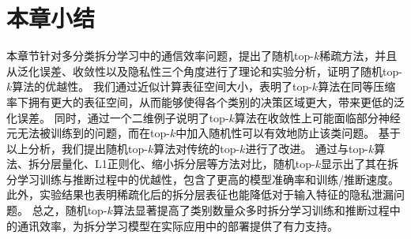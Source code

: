 \section{本章小结}
本章节针对多分类拆分学习中的通信效率问题，提出了随机top-$k$稀疏方法，并且从泛化误差、收敛性以及隐私性三个角度进行了理论和实验分析，证明了随机top-$k$算法的优越性。
%
我们通过近似计算表征空间大小，表明了top-$k$算法在同等压缩率下拥有更大的表征空间，从而能够使得各个类别的决策区域更大，带来更低的泛化误差。
%
同时，通过一个二维例子说明了top-$k$算法在收敛性上可能面临部分神经元无法被训练到的问题，而在top-$k$中加入随机性可以有效地防止该类问题。
%
基于以上分析，我们提出随机top-$k$算法对传统的top-$k$进行了改进。
%
通过与top-$k$算法、拆分层量化、L1正则化、缩小拆分层等方法对比，随机top-$k$显示出了其在拆分学习训练与推断过程中的优越性，包含了更高的模型准确率和训练/推断速度。
%
此外，实验结果也表明稀疏化后的拆分层表征也能降低对于输入特征的隐私泄漏问题。
%
总之，随机top-$k$算法显著提高了类别数量众多时拆分学习训练和推断过程中的通讯效率，为拆分学习模型在实际应用中的部署提供了有力支持。

